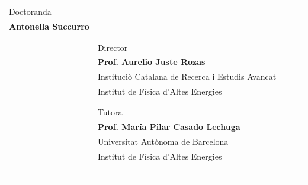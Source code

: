 \documentclass[titlepage]{article}
\begin{document}
\vspace{80pt} \\
\centering
\begin{tabular}{p{6cm}p{9cm}}
\large Doctoranda &  \\
\Large \bfseries Antonella Succurro & \\
 & \\
 & \\
 & \large Director \\
 &\Large \bfseries Prof. Aurelio Juste Rozas\\
 &\large Instituciò Catalana de Recerca i Estudis Avancat\\
 &\large Institut de F\'isica d’Altes Energies\\
 & \\
 & \\
 & \large Tutora \\
 &\Large \bfseries Prof. Mar\'ia Pilar Casado Lechuga\\
 &\large Universitat Autònoma de Barcelona\\
 &\large Institut de F\'isica d’Altes Energies\\
 & \\
 & \\
\end{tabular}
\hrule \vspace{6pt}
\large 
\end{document}
